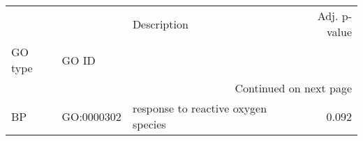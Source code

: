 \begin{longtable}{lllr}
\toprule
   &            &                          Description &  Adj. p-value \\
GO type & GO ID &                                      &               \\
\midrule
\endhead
\midrule
\multicolumn{4}{r}{{Continued on next page}} \\
\midrule
\endfoot

\bottomrule
\endlastfoot
BP & GO:0000302 &  response to reactive oxygen species &         0.092 \\
\end{longtable}

